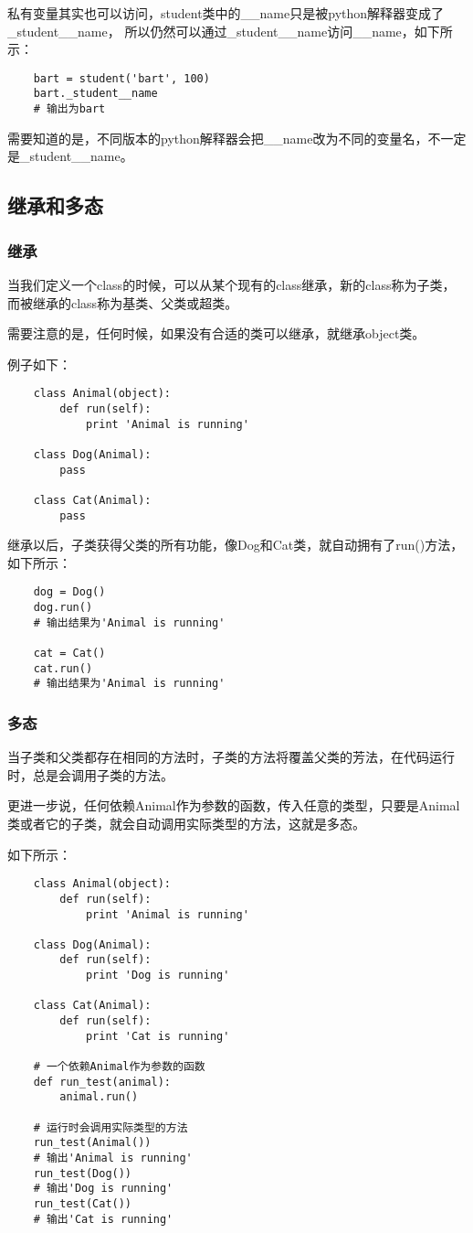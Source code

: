 \documentclass[a4paper,left=2.5cm,right=2.5cm,11pt]{article}
\begin{document}
	私有变量其实也可以访问，student类中的\_\_name只是被python解释器变成了\_student\_\_name，
	所以仍然可以通过\_student\_\_name访问\_\_name，如下所示：
	\begin{lstlisting}
	bart = student('bart', 100)
	bart._student__name
	# 输出为bart
	\end{lstlisting}

	需要知道的是，不同版本的python解释器会把\_\_name改为不同的变量名，不一定是\_student\_\_name。

\subsection{继承和多态}
\subsubsection{继承}
	当我们定义一个class的时候，可以从某个现有的class继承，新的class称为子类，而被继承的class称为基类、父类或超类。\par

	需要注意的是，任何时候，如果没有合适的类可以继承，就继承object类。\par

	例子如下：
	\begin{lstlisting}
	class Animal(object):
		def run(self):
			print 'Animal is running'

	class Dog(Animal):
		pass

	class Cat(Animal):
		pass
	\end{lstlisting}

	继承以后，子类获得父类的所有功能，像Dog和Cat类，就自动拥有了run()方法，如下所示：
	\begin{lstlisting}
	dog = Dog()
	dog.run()
	# 输出结果为'Animal is running'

	cat = Cat()
	cat.run()
	# 输出结果为'Animal is running'
	\end{lstlisting}

\subsubsection{多态}
	当子类和父类都存在相同的方法时，子类的方法将覆盖父类的芳法，在代码运行时，总是会调用子类的方法。\par

	更进一步说，任何依赖Animal作为参数的函数，传入任意的类型，只要是Animal类或者它的子类，就会自动调用实际类型的方法，这就是多态。\par

	如下所示：
	\begin{lstlisting}
	class Animal(object):
		def run(self):
			print 'Animal is running'

	class Dog(Animal):
		def run(self):
			print 'Dog is running'

	class Cat(Animal):
		def run(self):
			print 'Cat is running'

	# 一个依赖Animal作为参数的函数
	def run_test(animal):
		animal.run()

	# 运行时会调用实际类型的方法
	run_test(Animal())
	# 输出'Animal is running'
	run_test(Dog())
	# 输出'Dog is running'
	run_test(Cat())
	# 输出'Cat is running'
	\end{lstlisting}
\end{document}
